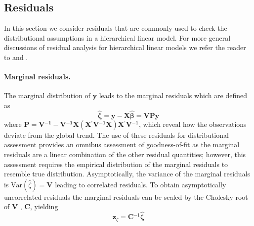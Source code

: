 \documentclass[11pt]{article} %
\newcommand{\inv}{\ensuremath{^{-1}}}
\newcommand{\trans}{\ensuremath{^\prime}}
\newcommand{\var}{\ensuremath{\mathrm{Var}}}
\begin{document}
\subsection{Residuals}

In this section we consider residuals that are commonly used to check the distributional assumptions in a hierarchical linear model. For more general discussions of residual analysis for hierarchical linear models we refer the reader to \cite{Haslett:2007vv} and \cite{Nobre:2007ej}.

\paragraph{Marginal residuals.} 
The marginal distribution of $\bm{y}$ leads to the marginal residuals which are defined as
%
\begin{equation}\label{eq:marginalresid}
\widehat{\bm{\zeta}}  = \bm{y} - \bm{X} \widehat{\bm{\beta}} =  \bm{V P y}
\end{equation}
%
where $ \bm{P} = \bm{V\inv} - \bm{V\inv X} \left( \bm{X\trans V\inv X} \right) \bm{X \trans V\inv}$, which reveal how the observations deviate from the global trend. The use of these residuals for distributional assessment provides an omnibus assessment of goodness-of-fit as the marginal residuals are a linear combination of the other residual quantities; however, this assessment requires the empirical distribution of the marginal residuals to resemble true distribution. Asymptotically, the variance of the marginal residuals is $\var(\widehat{\zeta}) = \bm{V}$ leading to correlated residuals. To obtain asymptotically uncorrelated residuals the marginal residuals can be scaled by the Cholesky root of $\bm{V}$ \citep{Houseman:2004gq}, $\bm{C}$, yielding
%
\begin{equation}\label{eq:choleskyresid}
\bm{z}_{\zeta}  = \bm{C}\inv \widehat{\bm{\zeta}}
\end{equation}
%
\end{document}
